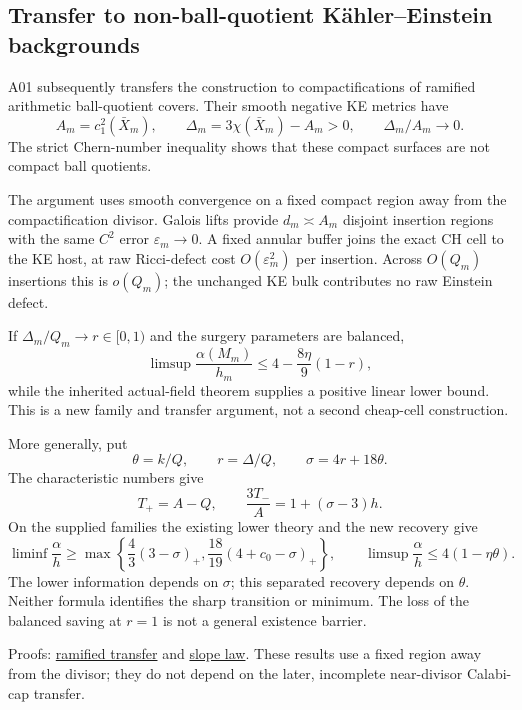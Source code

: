 \documentclass[
]{article}
\begin{document}
\hypertarget{transfer-to-non-ball-quotient-kuxe4hlereinstein-backgrounds}{%
\subsection{Transfer to non-ball-quotient Kähler--Einstein
backgrounds}\label{transfer-to-non-ball-quotient-kuxe4hlereinstein-backgrounds}}

A01 subsequently transfers the construction to compactifications of
ramified arithmetic ball-quotient covers. Their smooth negative KE
metrics have \[
 A_m=c_1^2(\bar X_m),\qquad
 \Delta_m=3\chi(\bar X_m)-A_m>0,\qquad \Delta_m/A_m\longrightarrow0.
\] The strict Chern-number inequality shows that these compact surfaces
are not compact ball quotients.

The argument uses smooth convergence on a fixed compact region away from
the compactification divisor. Galois lifts provide \(d_m\asymp A_m\)
disjoint insertion regions with the same \(C^2\) error
\(\varepsilon_m\to0\). A fixed annular buffer joins the exact CH cell to
the KE host, at raw Ricci-defect cost \(O(\varepsilon_m^2)\) per
insertion. Across \(O(Q_m)\) insertions this is \(o(Q_m)\); the
unchanged KE bulk contributes no raw Einstein defect.

If \(\Delta_m/Q_m\to r\in[0,1)\) and the surgery parameters are
balanced, \[
 \limsup\frac{\alpha(M_m)}{h_m}
 \le4-\frac{8\eta}{9}(1-r),
\] while the inherited actual-field theorem supplies a positive linear
lower bound. This is a new family and transfer argument, not a second
cheap-cell construction.

More generally, put \[
 \theta=k/Q,\qquad r=\Delta/Q,\qquad \sigma=4r+18\theta.
\] The characteristic numbers give \[
 T_+=A-Q,\qquad \frac{3T_-}{A}=1+(\sigma-3)h.
\] On the supplied families the existing lower theory and the new
recovery give \[
 \liminf\frac\alpha h\ge
 \max\left\{\frac43(3-\sigma)_+,\frac{18}{19}(4+c_0-\sigma)_+\right\},
 \qquad
 \limsup\frac\alpha h\le4(1-\eta\theta).
\] The lower information depends on \(\sigma\); this separated recovery
depends on \(\theta\). Neither formula identifies the sharp transition
or minimum. The loss of the balanced saving at \(r=1\) is not a general
existence barrier.

Proofs:
\href{sources/Sessions/S1003A01/workspace/notes/step31_ramified_KE_transfer_and_interface_simplification.md}{ramified
transfer} and
\href{sources/Sessions/S1003A01/workspace/notes/step33_surgery_slope_law_and_ASD_retention.md}{slope
law}. These results use a fixed region away from the divisor; they do
not depend on the later, incomplete near-divisor Calabi-cap transfer.
\end{document}
